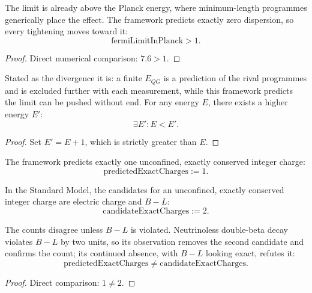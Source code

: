 \begin{theorem}
The limit is already above the Planck energy, where minimum-length programmes generically place the effect.  The framework predicts exactly zero dispersion, so every tightening moves toward it:
\begin{equation}
\text{fermiLimitInPlanck} > 1.
\end{equation}
\begin{proof}
Direct numerical comparison: $7.6 > 1$.
\end{proof}
\end{theorem}

\begin{theorem}
Stated as the divergence it is: a finite $E_{QG}$ is a prediction of the rival programmes and is excluded further with each measurement, while this framework predicts the limit can be pushed without end.  For any energy $E$, there exists a higher energy $E'$:
\begin{equation}
\exists E' : E < E'.
\end{equation}
\begin{proof}
Set $E' = E + 1$, which is strictly greater than $E$.
\end{proof}
\end{theorem}

\begin{definition}
The framework predicts exactly one unconfined, exactly conserved integer charge:
\begin{equation}
\text{predictedExactCharges} := 1.
\end{equation}
\end{definition}

\begin{definition}
In the Standard Model, the candidates for an unconfined, exactly conserved integer charge are electric charge and $B - L$:
\begin{equation}
\text{candidateExactCharges} := 2.
\end{equation}
\end{definition}

\begin{theorem}
The counts disagree unless $B - L$ is violated.  Neutrinoless double-beta decay violates $B - L$ by two units, so its observation removes the second candidate and confirms the count; its continued absence, with $B - L$ looking exact, refutes it:
\begin{equation}
\text{predictedExactCharges} \neq \text{candidateExactCharges}.
\end{equation}
\begin{proof}
Direct comparison: $1 \neq 2$.
\end{proof}
\end{theorem}

